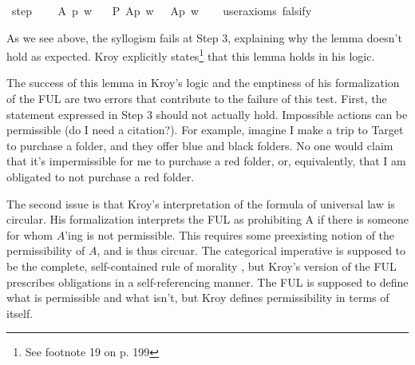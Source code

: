 \begin{isabellebody}
%
\endisadelimproof
\isanewline
{}\isamarkupfalse%
\ step{}{\isacharcolon}\ \isanewline
\ \ \ A\ p\ w\isanewline
\ \ \ {\isachardoublequoteopen}P\ {\isacharbraceleft}A{\isacharparenleft}p{\isacharparenright}{\isacharbraceright}\ w\ {\isasymlongrightarrow}\ {\isacharparenleft}{\isasymdiamond}\ {\isacharparenleft}A{\isacharparenleft}p{\isacharparenright}{\isacharparenright}\ w{\isacharparenright}{\isachardoublequoteclose}\isanewline
\ \ \isamarkupfalse%
\ {\isacharbrackleft}user{\isacharunderscore}axioms{\isacharcomma}\ falsify{\isacharbrackright}%
\isadelimproof
\ %
\endisadelimproof
%
\isatagproof
{}\isamarkupfalse%
\isanewline
%
%
\endisatagproof
{\isafoldproof}%
%
\isadelimproof
%
\endisadelimproof
%
\begin{isamarkuptext}%
As we see above, the syllogism fails at Step 3, explaining why the lemma doesn't 
        hold as expected. Kroy explicitly states\footnote{See footnote 19 on p. 199} that this lemma holds in his logic.

        The success of this lemma in Kroy's logic and the emptiness of his formalization of the FUL are 
        two errors that contribute to the failure of this test. First, the statement expressed in Step 3
        should not actually hold. Impossible actions can be permissible (do I need a citation?). For example, 
        imagine I make a trip to Target to 
        purchase a folder, and they offer blue and black folders. No one would claim that it's impermissible
        for me to purchase a red folder, or, equivalently, that I am obligated to not purchase a red folder.%
\end{isamarkuptext}\isamarkuptrue%
%
\begin{isamarkuptext}%
The second issue is that Kroy's interpretation of the formula of universal law is circular.
        His formalization interprets the FUL as prohibiting A if there is someone for whom 
        $A$'ing is not permissible. This requires some preexisting notion of the permissibility of $A$, and 
        is thus circuar. The categorical imperative is supposed to be the complete,
        self-contained rule of morality \cite{groundwork}, but Kroy's version of the FUL prescribes obligations 
        in a self-referencing manner. The FUL is supposed to define what is permissible and what isn't, 
        but Kroy defines permissibility in terms of itself.
        

\end{isamarkuptext}
\end{isabellebody}
